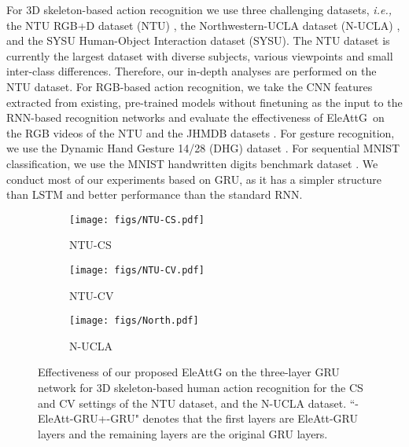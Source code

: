 \documentclass[journal]{IEEEtran}
\newcommand{\EleAttG}{{EleAttG~}}
\begin{document}
For 3D skeleton-based action recognition we use three challenging datasets, {\it{i.e.},} the NTU RGB+D dataset (NTU) \cite{Shahroudy_2016_CVPR}, the Northwestern-UCLA dataset (N-UCLA) \cite{wang2014cross}, and the SYSU Human-Object Interaction dataset (SYSU)\cite{hu2015jointly}. The NTU dataset is currently the largest dataset with diverse subjects, various viewpoints and small inter-class differences. Therefore, our in-depth analyses are performed on the NTU dataset. For RGB-based action recognition, we take the CNN features extracted from existing, pre-trained models without finetuning as the input to the RNN-based recognition networks and evaluate the effectiveness of \EleAttG on the RGB videos of the NTU and the JHMDB datasets \cite{jhuang2013towards}. For gesture recognition, we use the Dynamic Hand Gesture 14/28 (DHG) dataset \cite{de2016skeleton}. For sequential MNIST classification, we use the MNIST handwritten digits benchmark dataset \cite{lecun1998gradient}.  We conduct most of our experiments based on GRU, as it has a simpler structure than LSTM and better performance than the standard RNN.

\begin{figure*}[!]
	\centering
	\begin{subfigure}[t]{0.32\linewidth}
		\centering\texttt{[image: figs/NTU-CS.pdf]}
		\caption{NTU-CS}
		\label{subfig:CS}
	\end{subfigure}	
	\hfil
	\begin{subfigure}[t]{0.32\linewidth}
		\centering\texttt{[image: figs/NTU-CV.pdf]}
		\caption{NTU-CV}			
		\label{subfig:CV}
	\end{subfigure}
	\hfil
	\begin{subfigure}[t]{0.32\linewidth}
		\centering\texttt{[image: figs/North.pdf]}
		\caption{N-UCLA}			
		\label{subfig:N-UCLA}
	\end{subfigure}
	\caption{Effectiveness of our proposed EleAttG on the three-layer GRU network for 3D skeleton-based human action recognition for the CS and CV settings of the NTU dataset, and the N-UCLA dataset. ``-EleAtt-GRU+-GRU" denotes that the first  layers are EleAtt-GRU layers and the remaining  layers are the original GRU layers.}
	\label{fig:layer}
\end{figure*}
\end{document}
